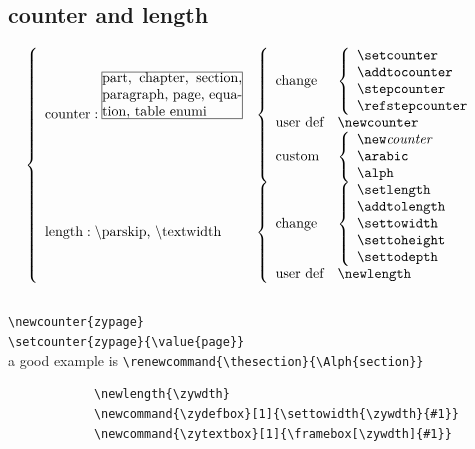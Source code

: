 \documentclass[a4paper,12pt,twoside]{book}
\begin{document}
	\subsection{counter and length}
			\[ \left\{ \begin{array}{lll}
				\textrm{counter}: \frame{\parbox{10em}{part, chapter,  section, paragraph,  page, equation, table enumi}} & \left\{ \begin{array}{ll} \textrm{change} & \left\{ \begin{array}{l}
													\verb=\setcounter= \\
													\verb=\addtocounter= \\	
													\verb=\stepcounter= \\
													\verb=\refstepcounter= \\	
												\end{array}
												\right.\\
										\textrm{user def} & \verb=\newcounter=  \\
										\textrm{custom} & \left\{ \begin{array}{l}
													 \verb=\new=\emph{counter}  \\
													\verb=\arabic= \\
													\verb=\alph= \\	
												\end{array}
												\right.
							\end{array}
						\right. \\
				\textrm{length}: \parbox{10em}{\textbackslash{}parskip, \textbackslash{}textwidth } & \left\{ \begin{array}{ll} \textrm{change} & \left\{ \begin{array}{l}
													\verb=\setlength= \\
													\verb=\addtolength= \\	
													\verb=\settowidth= \\
													\verb=\settoheight= \\
													\verb=\settodepth= \\	
												\end{array}
												\right.\\
										\textrm{user def} & \verb=\newlength=  \\
							\end{array}
						\right. \\
				\end{array}
			\right. \] \\
			\verb=\newcounter{zypage}= \\
			\verb=\setcounter{zypage}{\value{page}}= \\
			a good example is \verb=\renewcommand{\thesection}{\Alph{section}}= \\
			\begin{verbatim}
			\newlength{\zywdth}
			\newcommand{\zydefbox}[1]{\settowidth{\zywdth}{#1}}
			\newcommand{\zytextbox}[1]{\framebox[\zywdth]{#1}}
			\end{verbatim}
\end{document}
